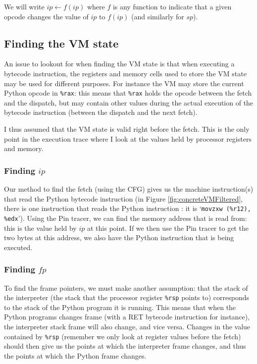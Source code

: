 \documentclass[english]{article}
\begin{document}
We will write $ip \leftarrow f(ip)$ where $f$ is any function to indicate that a given opcode changes the value of $ip$ to $f(ip)$ (and similarly for $sp$).

\subsection{Finding the VM state}

An issue to lookout for when finding the VM state is that when executing a bytecode instruction, the registers and memory cells used to store the VM state may be used for different purposes. For instance the VM may store the current Python opcode in \texttt{\%rax}: this means that \texttt{\%rax} holds the opcode between the fetch and the dispatch, but may contain other values during the actual execution of the bytecode instruction (between the dispatch and the next fetch).

I thus assumed that the VM state is valid right before the fetch. This is the only point in the execution trace where I look at the values held by processor registers and memory.

\subsubsection{Finding $ip$}

Our method to find the fetch (using the CFG) gives us the machine instruction(s) that read the Python bytecode instruction (in Figure \ref{fig:concreteVMFiltered}, there is one instruction that reads the Python instruction : it is `\texttt{movzxw (\%r12), \%edx}'). Using the Pin tracer, we can find the memory address that is read from: this is the value held by $ip$ at this point. If we then use the Pin tracer to get the two bytes at this address, we also have the Python instruction that is being executed.

\subsubsection{Finding $fp$}

To find the frame pointers, we must make another assumption: that the stack of the interpreter (the stack that the processor register \texttt{\%rsp} points to) corresponds to the stack of the Python program it is running. This means that when the Python programs changes frame (with a RET bytecode instruction for instance), the interpreter stack frame will also change, and vice versa. Changes in the value contained by \texttt{\%rsp} (remember we only look at register values before the fetch) should then give us the points at which the interpreter frame changes, and thus the points at which the Python frame changes. 
\end{document}
